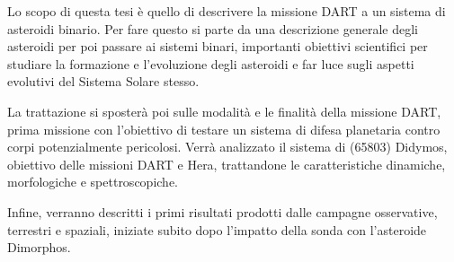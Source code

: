 \documentclass[a4paper,11pt,openright]{book}
\newenvironment{abstract}%
{\cleardoublepage%
\thispagestyle{empty}%
\null \vfill
\begin{center}%
\Huge \bfseries \abstractname 
\end{center}}%
{\vfill\null}
\begin{document}
\begin{frontespizio}

    
    
    
    
    
    
    {}
    
    
    
    
    
    
    
   
    
\end{frontespizio}



\frontmatter




\begin{abstract}    
Lo scopo di questa tesi è quello di descrivere la missione DART a un sistema di asteroidi binario. Per fare questo si parte da una descrizione generale degli asteroidi per poi passare ai sistemi binari, importanti obiettivi scientifici per studiare la formazione e l'evoluzione degli asteroidi e far luce sugli aspetti evolutivi del Sistema Solare stesso.

La trattazione si sposterà poi sulle modalità e le finalità della missione DART, prima missione con l'obiettivo di testare un sistema di difesa planetaria contro corpi potenzialmente pericolosi. Verrà analizzato il sistema di (65803) Didymos, obiettivo delle missioni DART e Hera, trattandone le caratteristiche dinamiche, morfologiche e spettroscopiche.

Infine, verranno descritti i primi risultati prodotti dalle campagne osservative, terrestri e spaziali, iniziate subito dopo l'impatto della sonda con l'asteroide Dimorphos.



\end{abstract}
\end{document}
